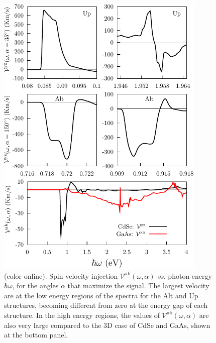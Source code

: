 \documentclass[floatfix,prb,aps,superscriptaddress,showpacs,11pt,preprint,letterpaper]{revtex4}
\def\tama{10cm}
\begin{document}
\begin{figure}[t]
\centering
\includegraphics[width=\tama]{figures/fig3}
\caption{(color online).  Spin velocity injection
  $\mathcal{V}^{\mathrm{ab}}(\omega,\alpha)$ {\it vs.} photon energy
  $\hbar\omega$, for the angles $\alpha$ that maximize the signal. The largest
  velocity are at the low energy regions of the spectra for the Alt and Up
  structures, becoming different from zero at the energy gap of each structure.
  In the high energy regions, the values of
  $\mathcal{V}^{\mathrm{ab}}(\omega,\alpha)$ are also very large compared to
  the 3D case of CdSe and GaAs, shown at the bottom panel.}
\label{fig:vab-str-comp}
\end{figure}
\end{document}
